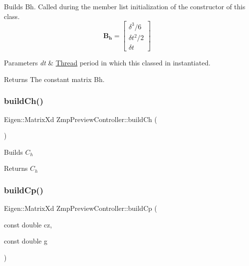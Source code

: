 Builds Bh. Called during the member list initialization of the constructor of this class. \[ \mathbf{B_h} = \left[ \begin{array}{c} \delta^3/6 \\ \delta t^2/2 \\ \delta t \end{array} \right] \]


\begin{DoxyParams}{Parameters}
{\em dt} & \hyperlink{classThread}{Thread} period in which this classed in instantiated.\\
\hline
\end{DoxyParams}
\begin{DoxyReturn}{Returns}
The constant matrix Bh. 
\end{DoxyReturn}
\hypertarget{classZmpPreviewController_a58723464a66fc3a1122c613500bb2052}{}\label{classZmpPreviewController_a58723464a66fc3a1122c613500bb2052} 
\subsubsection{\texorpdfstring{build\+Ch()}{buildCh()}}
{\footnotesize\ttfamily Eigen\+::\+Matrix\+Xd Zmp\+Preview\+Controller\+::build\+Ch (\begin{DoxyParamCaption}{ }\end{DoxyParamCaption})}

Builds $C_h$

\begin{DoxyReturn}{Returns}
$C_h$ 
\end{DoxyReturn}
\hypertarget{classZmpPreviewController_a716fdc040e5eaf9f6fe00c652f205d73}{}\label{classZmpPreviewController_a716fdc040e5eaf9f6fe00c652f205d73} 
\subsubsection{\texorpdfstring{build\+Cp()}{buildCp()}}
{\footnotesize\ttfamily Eigen\+::\+Matrix\+Xd Zmp\+Preview\+Controller\+::build\+Cp (\begin{DoxyParamCaption}\item[{const double}]{cz,  }\item[{const double}]{g }\end{DoxyParamCaption})}

